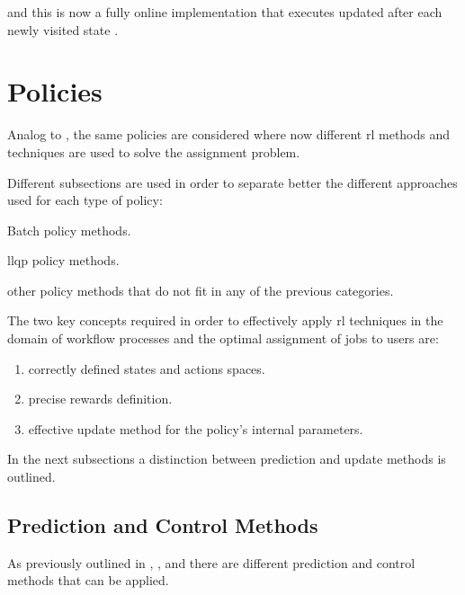 \documentclass{seal_thesis}
\begin{document}
and this is now a fully online implementation that executes updated after each newly visited state \cite[p. 274]{Sutton2017}. 

\section{ Policies}
\label{sec:rl_policies}

Analog to , the same policies are considered where now different \gls{rl} methods and techniques are used to solve the assignment problem.

Different subsections are used in order to separate better the different approaches used for each type of policy:
\begin{enumerate*}
	\item Batch policy methods.
	\item \gls{llqp} policy methods.
	\item other policy methods that do not fit in any of the previous categories.
\end{enumerate*}

The two key concepts required in order to effectively apply \gls{rl} techniques in the domain of workflow processes and the optimal assignment of jobs to users are:
\begin{enumerate}
	\item correctly defined states and actions spaces.
	\item precise rewards definition.
	\item effective update method for the policy's internal parameters. 
\end{enumerate}

In the next subsections a distinction between prediction and update methods is outlined.

\subsection{Prediction and Control Methods}

As previously outlined in , ,  and  there are different prediction and control methods that can be applied.

\subsubsection{}
\end{document}
